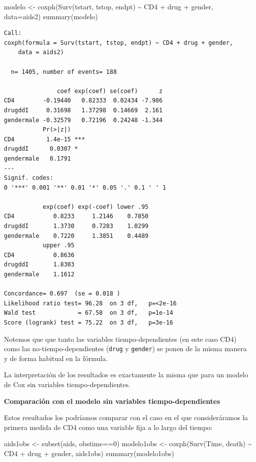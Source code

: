 \documentclass[
]{book}
\newenvironment{Shaded}{\begin{snugshade}}{\end{snugshade}}
\newcommand{\AttributeTok}[1]{\textcolor[rgb]{0.77,0.63,0.00}{#1}}
\newcommand{\DecValTok}[1]{\textcolor[rgb]{0.00,0.00,0.81}{#1}}
\newcommand{\FunctionTok}[1]{\textcolor[rgb]{0.00,0.00,0.00}{#1}}
\newcommand{\NormalTok}[1]{#1}
\newcommand{\OtherTok}[1]{\textcolor[rgb]{0.56,0.35,0.01}{#1}}
\newcommand{\SpecialCharTok}[1]{\textcolor[rgb]{0.00,0.00,0.00}{#1}}
\begin{document}
\begin{Shaded}
\begin{Highlighting}[]
\NormalTok{modelo }\OtherTok{\textless{}{-}} \FunctionTok{coxph}\NormalTok{(}\FunctionTok{Surv}\NormalTok{(tstart, tstop, endpt) }\SpecialCharTok{\textasciitilde{}}\NormalTok{ CD4 }\SpecialCharTok{+}\NormalTok{ drug }\SpecialCharTok{+}\NormalTok{ gender, }\AttributeTok{data=}\NormalTok{aids2)}
\FunctionTok{summary}\NormalTok{(modelo)}
\end{Highlighting}
\end{Shaded}

\begin{verbatim}
Call:
coxph(formula = Surv(tstart, tstop, endpt) ~ CD4 + drug + gender, 
    data = aids2)

  n= 1405, number of events= 188 

               coef exp(coef) se(coef)      z
CD4        -0.19440   0.82333  0.02434 -7.986
drugddI     0.31698   1.37298  0.14669  2.161
gendermale -0.32579   0.72196  0.24248 -1.344
           Pr(>|z|)    
CD4         1.4e-15 ***
drugddI      0.0307 *  
gendermale   0.1791    
---
Signif. codes:  
0 '***' 0.001 '**' 0.01 '*' 0.05 '.' 0.1 ' ' 1

           exp(coef) exp(-coef) lower .95
CD4           0.8233     1.2146    0.7850
drugddI       1.3730     0.7283    1.0299
gendermale    0.7220     1.3851    0.4489
           upper .95
CD4           0.8636
drugddI       1.8303
gendermale    1.1612

Concordance= 0.697  (se = 0.018 )
Likelihood ratio test= 96.28  on 3 df,   p=<2e-16
Wald test            = 67.58  on 3 df,   p=1e-14
Score (logrank) test = 75.22  on 3 df,   p=3e-16
\end{verbatim}

Notemos que que tanto las variables tiempo-dependientes (en este caso CD4) como las no-tiempo-dependientes (\texttt{drug} y \texttt{gender}) se ponen de la misma manera y de forma habitual en la fórmula.

La interpretación de los resultados es exactamente la misma que para un modelo de Cox sin variables tiempo-dependientes.

\textbf{Comparación con el modelo sin variables tiempo-dependientes}

Estos resultados los podríamos comparar con el caso en el que consideráramos la primera medida de CD4 como una variable fija a lo largo del tiempo:

\begin{Shaded}
\begin{Highlighting}[]
\NormalTok{aids1obs }\OtherTok{\textless{}{-}} \FunctionTok{subset}\NormalTok{(aids, obstime}\SpecialCharTok{==}\DecValTok{0}\NormalTok{)}
\NormalTok{modelo1obs }\OtherTok{\textless{}{-}} \FunctionTok{coxph}\NormalTok{(}\FunctionTok{Surv}\NormalTok{(Time, death) }\SpecialCharTok{\textasciitilde{}}\NormalTok{ CD4 }\SpecialCharTok{+}\NormalTok{ drug }\SpecialCharTok{+}\NormalTok{ gender, aids1obs)}
\FunctionTok{summary}\NormalTok{(modelo1obs)}
\end{Highlighting}
\end{Shaded}
\end{document}
